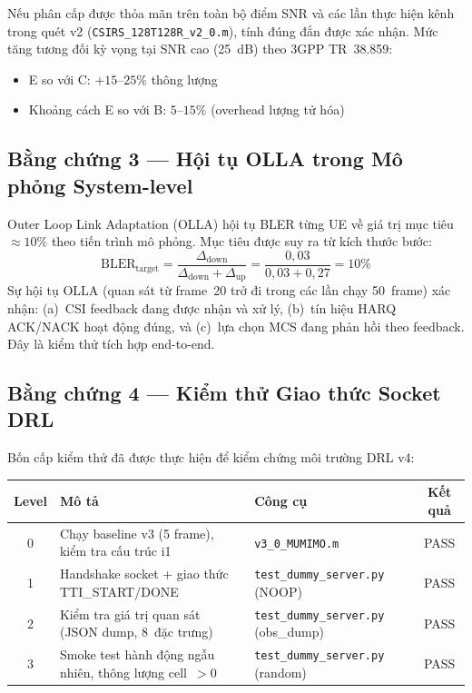 \documentclass[12pt, a4paper]{article}
\newcommand{\file}[1]{\texttt{#1}}
\begin{document}
Nếu phân cấp được thỏa mãn trên toàn bộ điểm SNR và các lần thực
hiện kênh trong quét v2 (\file{CSIRS\_128T128R\_v2\_0.m}), tính đúng
đắn được xác nhận. Mức tăng tương đối kỳ vọng tại SNR cao (25~dB)
theo 3GPP TR~38.859:
\begin{itemize}[nosep]
  \item E so với C: $+15\text{--}25\%$ thông lượng
  \item Khoảng cách E so với B: $5\text{--}15\%$ (overhead lượng tử hóa)
\end{itemize}

\subsection{Bằng chứng 3 --- Hội tụ OLLA trong Mô phỏng System-level}

Outer Loop Link Adaptation (OLLA) hội tụ BLER từng UE về giá trị
mục tiêu $\approx 10\%$ theo tiến trình mô phỏng. Mục tiêu được suy
ra từ kích thước bước:
\[
  \mathrm{BLER}_{\mathrm{target}} = \frac{\Delta_{\mathrm{down}}}{\Delta_{\mathrm{down}} + \Delta_{\mathrm{up}}} = \frac{0{,}03}{0{,}03 + 0{,}27} = 10\%
\]
Sự hội tụ OLLA (quan sát từ frame~20 trở đi trong các lần chạy 50~frame)
xác nhận: (a)~CSI feedback đang được nhận và xử lý, (b)~tín hiệu HARQ
ACK/NACK hoạt động đúng, và (c)~lựa chọn MCS đang phản hồi theo
feedback. Đây là kiểm thử tích hợp end-to-end.

\subsection{Bằng chứng 4 --- Kiểm thử Giao thức Socket DRL}

Bốn cấp kiểm thử đã được thực hiện để kiểm chứng môi trường DRL v4:

\begin{center}
\begin{tabular}{cL{4.5cm}L{3.7cm}c}
\toprule
\textbf{Level} & \textbf{Mô tả} & \textbf{Công cụ} & \textbf{Kết quả} \\
 & Chạy baseline v3 (5 frame), kiểm tra cấu trúc i1 &
  \file{v3\_0\_MUMIMO.m} & PASS \\[3pt]
1 & Handshake socket + giao thức TTI\_START/DONE &
  \file{test\_dummy\_server.py} (NOOP) & PASS \\[3pt]
2 & Kiểm tra giá trị quan sát (JSON dump, 8~đặc trưng) &
  \file{test\_dummy\_server.py} (obs\_dump) & PASS \\[3pt]
3 & Smoke test hành động ngẫu nhiên, thông lượng cell~$> 0$ &
  \file{test\_dummy\_server.py} (random) & PASS \\
\bottomrule
\end{tabular}
\label{tab:tests}
\end{center}
\end{document}
